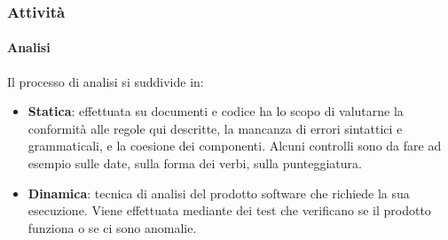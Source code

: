 		\subsubsection{Attività}
			\paragraph{Analisi}
			Il processo di analisi si suddivide in:
			\begin{itemize}
			\item \textbf{Statica}: effettuata su documenti e codice ha lo scopo di valutarne la conformità alle regole qui descritte, la mancanza di errori sintattici e grammaticali, e la coesione dei componenti. Alcuni controlli sono da fare ad esempio sulle date, sulla forma dei verbi, sulla punteggiatura.
			\item \textbf{Dinamica}: tecnica di analisi del prodotto software che richiede la sua esecuzione. Viene effettuata mediante dei test che verificano se il prodotto funziona o se ci sono anomalie.
			\end{itemize}
